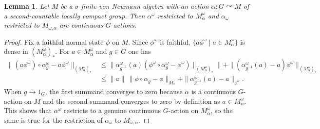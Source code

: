 \documentclass[11pt,a4paper]{article}
\newtheorem{lemma}[theorem]{Lemma}
\theoremstyle{definition}
\theoremstyle{remark}
\numberwithin{equation}{section}
\numberwithin{theorem}{section}
\newcommand{\acts}{\curvearrowright}
\begin{document}
\begin{lemma}
Let $M$ be a $\sigma$-finite von Neumann algebra with an action $\alpha\colon G \acts M$ of a second-countable locally compact group. 
Then $\alpha^\omega$ restricted to $M_\alpha^\omega$ and $\alpha_\omega$ restricted to $M_{\omega,\alpha}$ are continuous $G$-actions.
\end{lemma}
\begin{proof}
Fix a faithful normal state $\phi$ on $M$. Since $\phi^\omega$ is faithful, $\{a\phi^\omega \mid a \in M_\alpha^\omega\}$ is dense in $(M_\alpha^\omega)_*$. For $a \in M_\alpha^\omega$ and $g \in G$ one has
\begin{align*}
\|(a\phi^\omega)  \circ \alpha^\omega_g - a \phi^\omega \|_{(M_\alpha^\omega)_*} & \leq \|\alpha_{g^{-1}}^\omega(a)(\phi^\omega \circ \alpha_g^\omega - \phi^\omega)\|_{(M_\alpha^\omega)_*} \|+ \|(\alpha_{g^{-1}}^\omega(a) - a)\phi^\omega\|_{(M_\alpha^\omega)_*}\\
& \leq \|a\| \, \|\phi \circ \alpha_g - \phi\|_{M_*} + \|\alpha_{g^{-1}}^\omega(a) - a\|_{\phi^\omega}.
\end{align*}
When $g \rightarrow 1_G$, the first summand converges to zero because $\alpha$ is a continuous $G$-action on $M$ and the second summand converges to zero by definition as $a \in M_\alpha^\omega$. 
This shows that $\alpha^\omega$ restricts to a genuine continuous $G$-action on $M_\alpha^\omega$, so the same is true for the restriction of $\alpha_\omega$ to $M_{\omega, \alpha}$. 
\end{proof}
\end{document}

